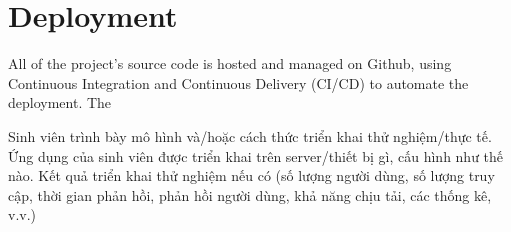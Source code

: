 \documentclass[../Main.tex]{subfiles}
\begin{document}
\section{Deployment}
 All of the project's source code is hosted and managed on Github, using Continuous Integration and Continuous Delivery (CI/CD) to automate the deployment. The 
 
Sinh viên trình bày mô hình và/hoặc cách thức triển khai thử nghiệm/thực tế. Ứng dụng của sinh viên được triển khai trên server/thiết bị gì, cấu hình như thế nào. Kết quả triển khai thử nghiệm nếu có (số lượng người dùng, số lượng truy cập, thời gian phản hồi, phản hồi người dùng, khả năng chịu tải, các thống kê, v.v.)
\end{document}
